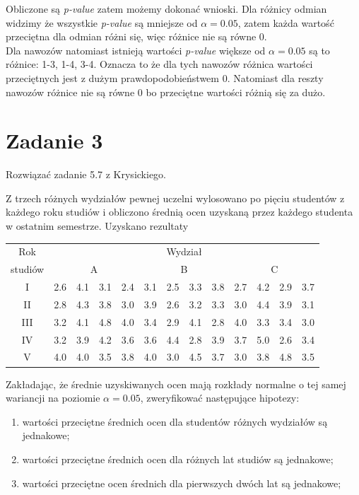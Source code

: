 \documentclass{article}
\begin{document}
Obliczone są \textit{p-value} zatem możemy dokonać wnioski. Dla różnicy odmian widzimy że wszystkie \textit{p-value} są mniejsze od $\alpha = 0.05$, zatem każda wartość przeciętna dla odmian różni się, więc różnice nie są równe 0. \\
Dla nawozów natomiast istnieją wartości \textit{p-value} większe od $\alpha = 0.05$ są to różnice: 1-3, 1-4, 3-4. Oznacza to że dla tych nawozów różnica wartości przeciętnych jest z dużym prawdopodobieństwem 0. Natomiast dla reszty nawozów różnice nie są równe 0 bo przeciętne wartości różnią się za dużo.

\newpage
\section{Zadanie 3}
Rozwiązać zadanie 5.7 z Krysickiego. \\ \par

Z trzech różnych wydziałów pewnej uczelni wylosowano po pięciu studentów z każdego roku studiów i obliczono średnią ocen uzyskaną przez każdego studenta w ostatnim semestrze. Uzyskano rezultaty
\begin{center} \begin{tabular}{|c|cccc|cccc|cccc|} \hline
Rok & \multicolumn{12}{|c|}{Wydział} \\ \cline{2-13}
studiów & \multicolumn{4}{|c|}{A} & \multicolumn{4}{|c|}{B} & \multicolumn{4}{|c|}{C} \\ \hline
I & 2.6 & 4.1 & 3.1 & 2.4 & 3.1 & 2.5 & 3.3 & 3.8 & 2.7 & 4.2 & 2.9 & 3.7 \\ 
II & 2.8 & 4.3 & 3.8 & 3.0 & 3.9 & 2.6 & 3.2 & 3.3 & 3.0 & 4.4 & 3.9 & 3.1 \\ 
III & 3.2 & 4.1 & 4.8 & 4.0 & 3.4 & 2.9 & 4.1 & 2.8 & 4.0 & 3.3 & 3.4 & 3.0 \\ 
IV & 3.2 & 3.9 & 4.2 & 3.6 & 3.6 & 4.4 & 2.8 & 3.9 & 3.7 & 5.0 & 2.6 & 3.4 \\ 
V & 4.0 & 4.0 & 3.5 & 3.8 & 4.0 & 3.0 & 4.5 & 3.7 & 3.0 & 3.8 & 4.8 & 3.5 \\ \hline
\end{tabular} \end{center}

Zakładając, że średnie uzyskiwanych ocen mają rozkłady normalne o tej samej wariancji na poziomie $\alpha = 0.05$, zweryfikować następujące hipotezy:
\begin{enumerate}[label = \alph*)]
\item wartości przeciętne średnich ocen dla studentów różnych wydziałów są jednakowe;
\item wartości przeciętne średnich ocen dla różnych lat studiów są jednakowe;
\item wartości przeciętne ocen średnich dla pierwszych dwóch lat są jednakowe;
\end{enumerate}
\end{document}
